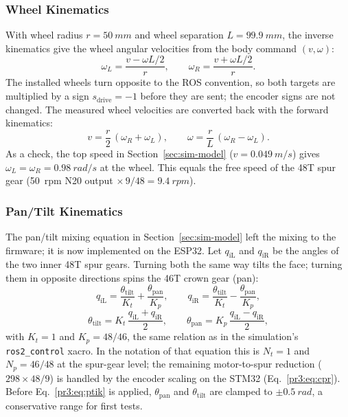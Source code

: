 \documentclass[12pt,a4paper]{article}
\begin{document}
\subsubsection{Wheel Kinematics}

With wheel radius $r=\SI{50}{mm}$ and wheel separation $L=\SI{99.9}{mm}$, the inverse
kinematics give the wheel angular velocities from the body command $(v,\omega)$:
\begin{equation}
  \omega_L = \frac{v-\omega L/2}{r}, \qquad \omega_R = \frac{v+\omega L/2}{r}.
  \label{pr3:eq:ik}
\end{equation}
The installed wheels turn opposite to the ROS convention, so both targets are multiplied
by a sign $s_\text{drive}=-1$ before they are sent; the encoder signs are not changed.
The measured wheel velocities are converted back with the forward kinematics:
\begin{equation}
  v = \frac{r}{2}\,(\omega_R+\omega_L), \qquad \omega = \frac{r}{L}\,(\omega_R-\omega_L).
  \label{pr3:eq:fk}
\end{equation}
As a check, the top speed in Section~\ref{sec:sim-model} ($v=\SI{0.049}{m/s}$) gives
$\omega_L=\omega_R=\SI{0.98}{rad/s}$ at the wheel. This equals the free speed of the
48T spur gear (\SI{50}{rpm} N20 output $\times\,9/48 = \SI{9.4}{rpm}$).

\subsubsection{Pan/Tilt Kinematics}

The pan/tilt mixing equation in Section~\ref{sec:sim-model} left the mixing to the firmware; it is now implemented on the ESP32.
Let $q_\text{iL}$ and $q_\text{iR}$ be the angles of the two inner 48T spur gears. Turning
both the same way tilts the face; turning them in opposite directions spins the 46T crown
gear (pan):
\begin{equation}
  q_\text{iL} = \frac{\theta_\text{tilt}}{K_t} + \frac{\theta_\text{pan}}{K_p}, \qquad
  q_\text{iR} = \frac{\theta_\text{tilt}}{K_t} - \frac{\theta_\text{pan}}{K_p},
  \label{pr3:eq:ptik}
\end{equation}
\begin{equation}
  \theta_\text{tilt} = K_t\,\frac{q_\text{iL}+q_\text{iR}}{2}, \qquad
  \theta_\text{pan}  = K_p\,\frac{q_\text{iL}-q_\text{iR}}{2},
  \label{pr3:eq:ptfk}
\end{equation}
with $K_t=1$ and $K_p=48/46$, the same relation as in the simulation's
\texttt{ros2\_control} xacro. In the notation of that equation this is $N_t=1$ and
$N_p=46/48$ at the spur-gear level; the remaining motor-to-spur reduction
($298\times48/9$) is handled by the encoder scaling on the STM32 (Eq.~\eqref{pr3:eq:cpr}).
Before Eq.~\eqref{pr3:eq:ptik} is applied, $\theta_\text{pan}$ and $\theta_\text{tilt}$ are
clamped to $\pm\SI{0.5}{rad}$, a conservative range for first tests.
\end{document}

